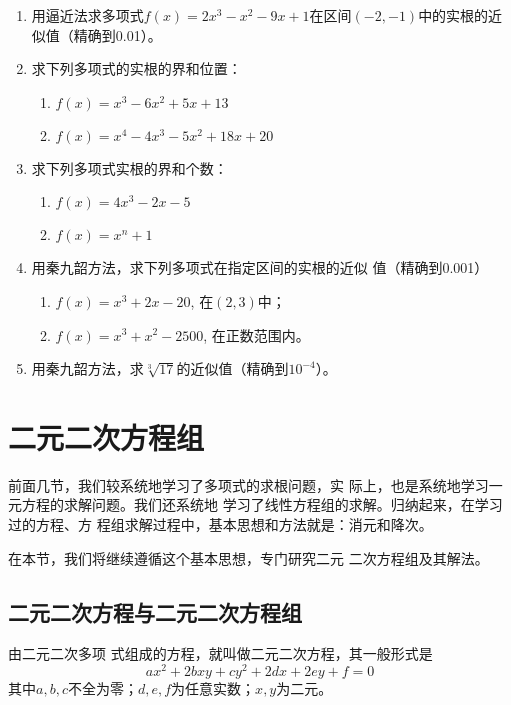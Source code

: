 \begin{enumerate}
    \item 用逼近法求多项式$f(x)=2x^3-x^2-9x+1$在区间$(-2,
    -1)$中的实根的近似值（精确到0.01）。
    \item 求下列多项式的实根的界和位置：
    \begin{enumerate}
        \item  $f(x)=x^3-6x^2+5x+13$
        \item  $f(x)=x^4-4x^3-5x^2+18x+20$
    \end{enumerate}

    \item 求下列多项式实根的界和个数：
    \begin{enumerate}
        \item   $f(x)=4x^3-2x-5$
        \item  $f(x)=x^n+1$
    \end{enumerate}
  
    \item  用秦九韶方法，求下列多项式在指定区间的实根的近似
    值（精确到0.001）
    \begin{enumerate}
      \item $f(x)=x^3+2x-20$, 在$(2,3)$中；
    \item $f(x)=x^3+x^2-2500$, 在正数范围内。
    \end{enumerate}
    \item  用秦九韶方法，求$\sqrt[3]{17}$的近似值（精确到$10^{-4}$）。
\end{enumerate}

\section{二元二次方程组}
前面几节，我们较系统地学习了多项式的求根问题，实
际上，也是系统地学习一元方程的求解问题。我们还系统地
学习了线性方程组的求解。归纳起来，在学习过的方程、方
程组求解过程中，基本思想和方法就是：消元和降次。

在本节，我们将继续遵循这个基本思想，专门研究二元
二次方程组及其解法。

\subsection{二元二次方程与二元二次方程组}

由二元二次多项
式组成的方程，就叫做二元二次方程，其一般形式是
\begin{equation}
    ax^2+2bxy+cy^2+2dx+2ey+f=0
\end{equation}
其中$a,b,c$不全为零；$d,e,f$为任意实数；$x,y$为二元。

